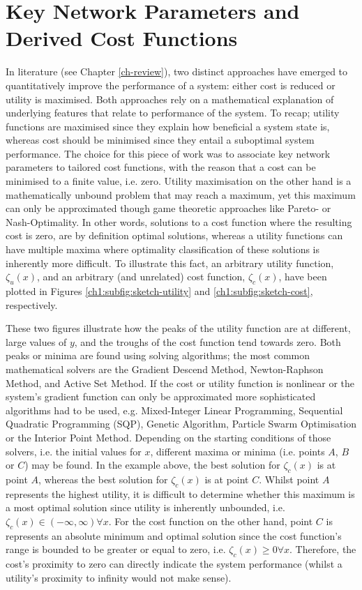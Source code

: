 \section{Key Network Parameters and Derived Cost Functions}
\label{ch1:sec:key-network-parameters}

In literature (see Chapter \ref{ch-review}), two distinct approaches have emerged to quantitatively improve the performance of a system:
either cost is reduced or utility is maximised.
Both approaches rely on a mathematical explanation of underlying features that relate to performance of the system.
To recap; utility functions are maximised since they explain how beneficial a system state is, whereas cost should be minimised since they entail a suboptimal system performance.
The choice for this piece of work was to associate key network parameters to tailored cost functions, with the reason that a cost can be minimised to a finite value, i.e. zero.
Utility maximisation on the other hand is a mathematically unbound problem that may reach a maximum, yet this maximum can only be approximated though game theoretic approaches like Pareto- or Nash-Optimality.
In other words, solutions to a cost function where the resulting cost is zero, are by definition optimal solutions, whereas a utility functions can have multiple maxima where optimality classification of these solutions is inherently more difficult.
To illustrate this fact, an arbitrary utility function, $\zeta_{u}(x)$, and an arbitrary (and unrelated) cost function, $\zeta_{c}(x)$, have been plotted in Figures \ref{ch1:subfig:sketch-utility} and \ref{ch1:subfig:sketch-cost}, respectively.



These two figures illustrate how the peaks of the utility function are at different, large values of $y$, and the troughs of the cost function tend towards zero.
Both peaks or minima are found using solving algorithms; the most common mathematical solvers are the Gradient Descend Method, Newton-Raphson Method, and Active Set Method.
If the cost or utility function is nonlinear or the system's gradient function can only be approximated more sophisticated algorithms had to be used, e.g. Mixed-Integer Linear Programming, Sequential Quadratic Programming (SQP), Genetic Algorithm, Particle Swarm Optimisation or the Interior Point Method.
Depending on the starting conditions of those solvers, i.e. the initial values for $x$, different maxima or minima (i.e. points $A$, $B$ or $C$) may be found.
In the example above, the best solution for $\zeta_{c}(x)$ is at point $A$, whereas the best solution for $\zeta_{c}(x)$ is at point $C$.
Whilst point $A$ represents the highest utility, it is difficult to determine whether this maximum is a most optimal solution since utility is inherently unbounded, i.e. $\zeta_{c}(x) \in (-\infty, \infty) \forall x$.
For the cost function on the other hand, point $C$ is represents an absolute minimum and optimal solution since the cost function's range is bounded to be greater or equal to zero, i.e. $\zeta_{c}(x) \geq 0 \forall x$.
Therefore, the cost's proximity to zero can directly indicate the system performance (whilst a utility's proximity to infinity would not make sense).

